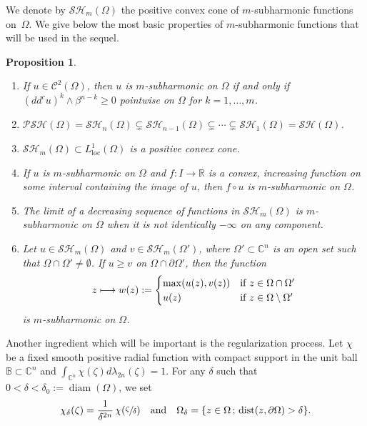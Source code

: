 \documentclass[11pt]{article}
\newcommand{\skpt}{\smallskip}
\providecommand{\C}{}
\numberwithin{equation}{section}
\newcommand{\mto}{\mathchoice{\longmapsto}{\mapsto}{\mapsto}{\mapsto}}
\newcommand{\loc}{\mathrm{loc}}
\newcommand{\sep}{\,;\,}
\DeclareMathOperator{\dist}{dist}
\newtheorem{proposition}[theorem]{Proposition}
\theoremstyle{definition}
\newcommand{\B}{\mathbb{B}}
\newcommand{\R}{\mathbb{R}}
\renewcommand{\C}{\mathbb{C}}
\newcommand{\Cc}{\mathcal{C}}
\DeclareMathOperator{\diam}{diam}
\theoremstyle{plain}
\theoremstyle{definition}
\begin{document}
We denote by $\mathcal{SH}_m (\Omega) $ the positive convex cone of $m$-subharmonic functions on~$\Omega$. We give below the most basic properties of $m$-subharmonic functions that will be used in the sequel.

\skpt
\begin{proposition}\label{prop:basic}
\begin{enumerate}
\item
If $u\in \Cc^2(\Omega)$, then $u$ is $m$-subharmonic on $\Omega$ if and only if $(dd^c u)^k\wedge \beta^{n-k}\geq0$
pointwise on $\Omega$ for $k=1,\dots, m$.

\item
$\mathcal{PSH}(\Omega)=\mathcal{SH}_n(\Omega)\subsetneq \mathcal{SH}_{n-1}(\Omega)\subsetneq\cdots\subsetneq \mathcal{SH}_1(\Omega)=\mathcal{SH}(\Omega) $.

\item
$\mathcal{SH}_m(\Omega) \subset L^1_{\loc} (\Omega)$ is a positive convex cone.

\item
If $u$ is $m$-subharmonic on $\Omega$ and $f: I \to\R$ is a convex, increasing function on some interval containing the image of $u$, then $f\circ u$ is $m$-subharmonic on $\Omega$.

\item
The limit of a decreasing sequence of functions in $\mathcal{SH}_m(\Omega)$ is $m$-subharmonic on $\Omega$ when it is not identically $- \infty$ on any component.

\item
Let $u \in \mathcal{SH}_m(\Omega)$ and $v \in \mathcal{SH}_m(\Omega') $, where $\Omega'\subset\C^n$ is an open set such that $\Omega \cap \Omega' \neq \emptyset$. If $u\geq v$ on $\Omega \cap \partial\Omega'$, then the function
\[
z \mto w(z):=\begin{cases}
\max(u(z),v(z)) &\text{if } z \in \Omega \cap \Omega'\\
u(z) &\hbox{if } z \in\Omega\setminus\Omega'
\end{cases}
\]
is $m$-subharmonic on $\Omega$.
\end{enumerate}
\end{proposition}

Another ingredient which will be important is the regularization process. Let $\chi$ be a fixed smooth positive radial function with compact support in the unit ball $\B \subset \C^n$ and $\int_{\C^n}\chi (\zeta)d\lambda_{2 n}(\zeta)=1$.
For any $\delta$ such that $ 0 < \delta < \delta_0:= \diam (\Omega)$, we set
\[
\chi_{\delta}(\zeta)=\frac{1}{\delta^{2n}}\,\chi (\sfrac{\zeta}{\delta})\quad\text{and}\quad \Omega_{\delta}=\{z \in\Omega\sep \dist (z,\partial\Omega)>\delta\}.
\]
\end{document}
